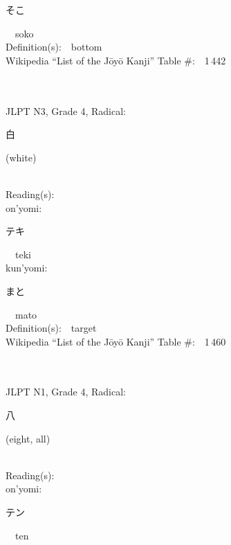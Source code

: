 \begin{multicols}{2}
{\hspace*{2em}}{\begin{CJK}{UTF8}{min} そこ \end{CJK}}\ \ soko\ \ \\
Definition(s):\ \ bottom \\
Wikipedia ``List of the J\=oy\=o Kanji'' Table \#:\ \ 1\,442 \\
\ \ \\
{\fontsize{34pt}{40pt}  }\ \ \\  %
{JLPT N3, Grade 4, Radical:\ \ {\begin{CJK}{UTF8}{min} 白 \end{CJK}} (white) } \\
Reading(s):\ \ \\
{\hspace*{1em}}on'yomi:\ \ \\
{\hspace*{2em}}{\begin{CJK}{UTF8}{min} テキ \end{CJK}}\ \ teki\ \ \\
{\hspace*{1em}}kun'yomi:\ \ \\
{\hspace*{2em}}{\begin{CJK}{UTF8}{min} まと \end{CJK}}\ \ mato\ \ \\
Definition(s):\ \ target \\
Wikipedia ``List of the J\=oy\=o Kanji'' Table \#:\ \ 1\,460 \\
\ \ \\
{\fontsize{34pt}{40pt}  }\ \ \\  %
{JLPT N1, Grade 4, Radical:\ \ {\begin{CJK}{UTF8}{min} 八 \end{CJK}} (eight, all) } \\
Reading(s):\ \ \\
{\hspace*{1em}}on'yomi:\ \ \\
{\hspace*{2em}}{\begin{CJK}{UTF8}{min} テン \end{CJK}}\ \ ten\ \ \\

\end{multicols}
